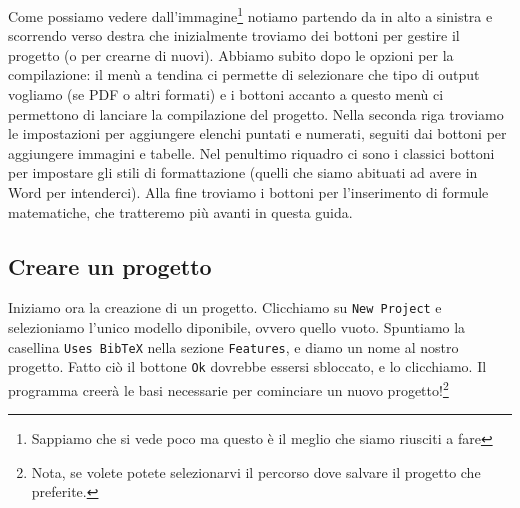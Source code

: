 Come possiamo vedere dall'immagine\footnote{Sappiamo che si vede poco
ma questo \`e il meglio che siamo riusciti a fare} notiamo partendo da in alto
a sinistra e scorrendo verso destra che inizialmente troviamo dei bottoni per
gestire il progetto (o per crearne di nuovi).
Abbiamo subito dopo le opzioni per la compilazione: il men\`u a tendina ci
permette di selezionare che tipo di output vogliamo (se PDF o altri formati) e
i bottoni accanto a questo men\`u ci permettono di lanciare la compilazione
del progetto.
Nella seconda riga troviamo le impostazioni per aggiungere elenchi puntati e
numerati, seguiti dai bottoni per aggiungere immagini e tabelle. Nel penultimo
riquadro ci sono i classici bottoni per impostare gli stili di formattazione
(quelli che siamo abituati ad avere in Word per intenderci).
Alla fine troviamo i bottoni per l'inserimento di formule matematiche, che
tratteremo pi\`u avanti in questa guida.

\subsection{Creare un progetto}

Iniziamo ora la creazione di un progetto.
Clicchiamo su \texttt{New Project} e selezioniamo l'unico modello diponibile,
ovvero quello vuoto. Spuntiamo la casellina \texttt{Uses BibTeX} nella sezione
\texttt{Features}, e diamo un nome al nostro progetto. Fatto ci\`o il bottone
\texttt{Ok} dovrebbe essersi sbloccato, e lo clicchiamo. Il programma creer\`a
le basi necessarie per cominciare un nuovo progetto!\footnote{Nota, se volete
potete selezionarvi il percorso dove salvare il progetto che preferite.}
